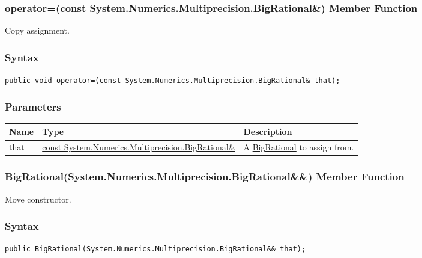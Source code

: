 \documentclass[a4paper,oneside,11.000000pt]{book}
\begin{document}
\hypertarget{System.Numerics.Multiprecision.BigRational.operator.assign.P.System.Numerics.Multiprecision.BigRational.C.R.System.Numerics.Multiprecision.BigRational}{\subsubsection*{operator=(const System.Numerics.Multiprecision.BigRational\&) Member Function}}\begin{flushleft}
Copy assignment.

\end{flushleft}
\subsubsection*{Syntax}
\texttt{public void operator=(const System.Numerics.Multiprecision.BigRational\& that);}
\subsubsection*{Parameters}
\begin{flushleft}
\begin{supertabular}[l]{!{\raggedright}p{1.30721cm}!{\raggedright}p{8.55945cm}!{\raggedright}p{4.93333cm}}
\textbf{Name}
& \textbf{Type}
& \textbf{Description}
\\
\hline
that
& \hyperlink{System.Numerics.Multiprecision.BigRational}{const System.\-Numerics.\-Multiprecision.\-BigRational\&\-}
& A \hyperlink{System.Numerics.Multiprecision.BigRational}{BigRational} to assign from.

\\
\end{supertabular}

\end{flushleft}
\clearpage

\hypertarget{System.Numerics.Multiprecision.BigRational.constructor.P.System.Numerics.Multiprecision.BigRational.RR.System.Numerics.Multiprecision.BigRational}{\subsubsection*{BigRational(System.Numerics.Multiprecision.BigRational\&\&) Member Function}}\begin{flushleft}
Move constructor.

\end{flushleft}
\subsubsection*{Syntax}
\texttt{public BigRational(System.Numerics.Multiprecision.BigRational\&\& that);}
\end{document}
